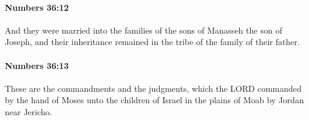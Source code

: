 		\paragraph{Numbers 36:12} %
			\label{NUMBERS-36-12}

			And they were married into the families of the sons of Manasseh the son of Joseph, and their inheritance remained in the tribe of the family of their father.


		\paragraph{Numbers 36:13} %
			\label{NUMBERS-36-13}

			These are the commandments and the judgments, which the LORD commanded by the hand of Moses unto the children of Israel in the plains of Moab by Jordan near Jericho.

